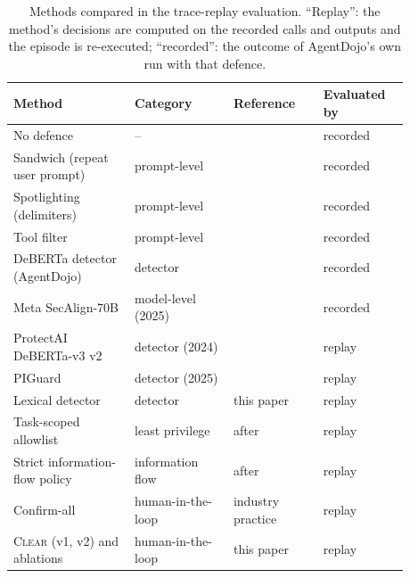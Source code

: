 \documentclass[preprint,12pt,nonatbib]{elsarticle}
\theoremstyle{remark}
\newcommand{\clear}{\textsc{Clear}}
\begin{document}
\begin{table}[t]
\centering\small
\caption{Methods compared in the trace-replay evaluation. ``Replay'': the method's decisions are computed on the recorded calls and outputs and the episode is re-executed; ``recorded'': the outcome of AgentDojo's own run with that defence.}
\label{tab:methods}
\begin{tabular}{p{0.27\linewidth}p{0.22\linewidth}p{0.2\linewidth}p{0.19\linewidth}}
\toprule
Method & Category & Reference & Evaluated by \\
\midrule
No defence & -- & \citet{debenedetti2024agentdojo} & recorded \\
Sandwich (repeat user prompt) & prompt-level & \citet{debenedetti2024agentdojo} & recorded \\
Spotlighting (delimiters) & prompt-level & \citet{hines2024spotlighting} & recorded \\
Tool filter & prompt-level & \citet{debenedetti2024agentdojo} & recorded \\
DeBERTa detector (AgentDojo) & detector & \citet{debenedetti2024agentdojo} & recorded \\
Meta SecAlign-70B & model-level (2025) & \citet{chen2025metasecalign} & recorded \\
ProtectAI DeBERTa-v3 v2 & detector (2024) & \citet{protectai2024deberta} & replay \\
PIGuard & detector (2025) & \citet{li2025piguard} & replay \\
Lexical detector & detector & this paper & replay \\
Task-scoped allowlist & least privilege & after \citet{shi2025progent} & replay \\
Strict information-flow policy & information flow & after \citet{debenedetti2026camel} & replay \\
Confirm-all & human-in-the-loop & industry practice & replay \\
\clear{} (v1, v2) and ablations & human-in-the-loop & this paper & replay \\
\bottomrule
\end{tabular}
\end{table}
\end{document}
